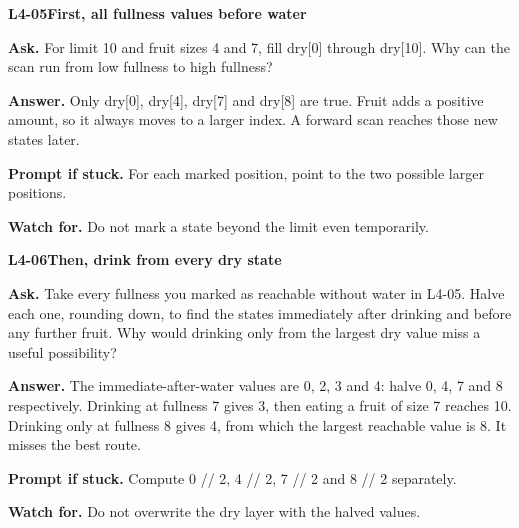 \documentclass[11pt,a4paper]{article}
\begin{document}
\par\medskip
\noindent\begin{minipage}{\textwidth}
{\color{teal}\textbf{L4-05}}\quad \textbf{First, all fullness values before water}\par\smallskip
\textbf{Ask.} For limit 10 and fruit sizes 4 and 7, fill dry[0] through dry[10]. Why can the scan run from low fullness to high fullness?\par\smallskip
\textbf{Answer.} Only dry[0], dry[4], dry[7] and dry[8] are true. Fruit adds a positive amount, so it always moves to a larger index. A forward scan reaches those new states later.\par\smallskip
\textbf{Prompt if stuck.} For each marked position, point to the two possible larger positions.\par\smallskip
\textbf{Watch for.} Do not mark a state beyond the limit even temporarily.
\end{minipage}\par{}\medskip

\noindent\begin{minipage}{\textwidth}
{\color{teal}\textbf{L4-06}}\quad \textbf{Then, drink from every dry state}\par\smallskip
\textbf{Ask.} Take every fullness you marked as reachable without water in L4-05. Halve each one, rounding down, to find the states immediately after drinking and before any further fruit. Why would drinking only from the largest dry value miss a useful possibility?\par\smallskip
\textbf{Answer.} The immediate-after-water values are 0, 2, 3 and 4: halve 0, 4, 7 and 8 respectively. Drinking at fullness 7 gives 3, then eating a fruit of size 7 reaches 10. Drinking only at fullness 8 gives 4, from which the largest reachable value is 8. It misses the best route.\par\smallskip
\textbf{Prompt if stuck.} Compute 0 // 2, 4 // 2, 7 // 2 and 8 // 2 separately.\par\smallskip
\textbf{Watch for.} Do not overwrite the dry layer with the halved values.
\end{minipage}\par{}\medskip
\end{document}
